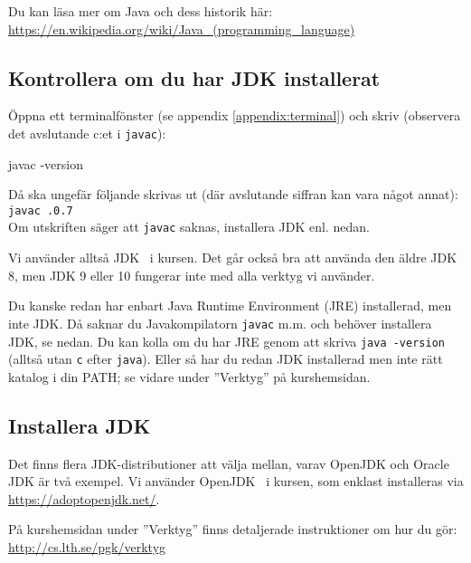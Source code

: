 \noindent Du kan läsa mer om Java och dess historik här: \\
\href{https://en.wikipedia.org/wiki/Java_(programming_language)}{https://en.wikipedia.org/wiki/Java\_(programming\_language)}

\subsection{Kontrollera om du har JDK installerat}\label{appendix:compile:check-jdk}

Öppna ett terminalfönster (se appendix \ref{appendix:terminal}) och skriv (observera det avslutande c:et i \texttt{javac}):
\begin{REPLnonum}
javac -version
\end{REPLnonum}
Då ska ungefär följande skrivas ut (där avslutande siffran kan vara något annat):\\
\texttt{javac \JDKVersion.0.7}\\
Om utskriften säger att \texttt{javac} saknas, installera JDK enl. nedan.

Vi använder alltså JDK \JDKVersion~i kursen. Det går också bra att använda den äldre JDK 8, men JDK 9 eller 10 fungerar inte med alla verktyg vi använder. 

Du kanske redan har enbart Java Runtime Environment (JRE) installerad, men inte JDK. Då saknar du Javakompilatorn \texttt{javac} m.m. och behöver installera JDK, se nedan. Du kan kolla om du har JRE genom att skriva \texttt{java -version} (alltså utan \texttt{c} efter \texttt{java}). Eller så har du redan JDK installerad men inte rätt katalog i din PATH; se vidare under ''Verktyg'' på kurshemsidan.



\subsection{Installera JDK}\label{appendix:compile:install-jdk}

Det finns flera JDK-distributioner att välja mellan, varav OpenJDK och Oracle JDK är två exempel. Vi använder OpenJDK \JDKVersion~i kursen, som enklast installeras via \\ \url{https://adoptopenjdk.net/}. %

På kurshemsidan under ''Verktyg'' finns detaljerade instruktioner om hur du gör:  \url{http://cs.lth.se/pgk/verktyg}

